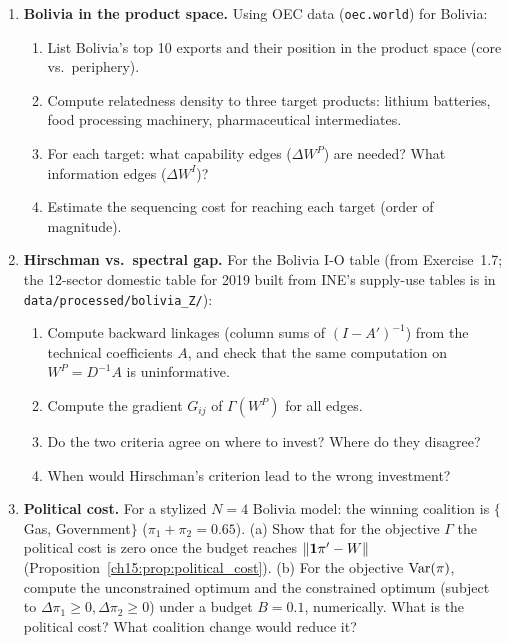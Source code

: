 \documentclass[../structural_economics_book.tex]{subfiles}
\begin{document}
\begin{enumerate}[label=\textbf{15.\arabic*}, leftmargin=3em]
\item \textbf{Bolivia in the product space.}\label{ch15:ex:ps_data} Using OEC data (\texttt{oec.world}) for Bolivia:
\begin{enumerate}
\item List Bolivia's top 10 exports and their position in the product space (core vs.\ periphery).
\item Compute relatedness density to three target products: lithium batteries, food processing machinery, pharmaceutical intermediates.
\item For each target: what capability edges ($\Delta W^P$) are needed? What information edges ($\Delta W^I$)?
\item Estimate the sequencing cost for reaching each target (order of magnitude).
\end{enumerate}

\item \textbf{Hirschman vs.\ spectral gap.} For the Bolivia I-O table (from Exercise~1.7; the 12-sector domestic table for 2019 built from INE's supply-use tables is in \texttt{data/processed/bolivia\_Z/}):
\begin{enumerate}
\item Compute backward linkages (column sums of $(I - A')^{-1}$) from the technical coefficients $A$, and check that the same computation on $W^P = D^{-1}A$ is uninformative.
\item Compute the gradient $G_{ij}$ of $\Gamma(W^P)$ for all edges.
\item Do the two criteria agree on where to invest? Where do they disagree?
\item When would Hirschman's criterion lead to the wrong investment?
\end{enumerate}

\item \textbf{Political cost.} For a stylized $N = 4$ Bolivia model: the winning coalition is $\{$Gas, Government$\}$ ($\pi_1 + \pi_2 = 0.65$). (a) Show that for the objective $\Gamma$ the political cost is zero once the budget reaches $\|\mathbf{1}\pi' - W\|$ (Proposition~\ref{ch15:prop:political_cost}). (b) For the objective $\operatorname{Var}(\pi)$, compute the unconstrained optimum and the constrained optimum (subject to $\Delta\pi_1 \geq 0, \Delta\pi_2 \geq 0$) under a budget $B = 0.1$, numerically. What is the political cost? What coalition change would reduce it?
\end{enumerate}


\newpage
\end{document}
